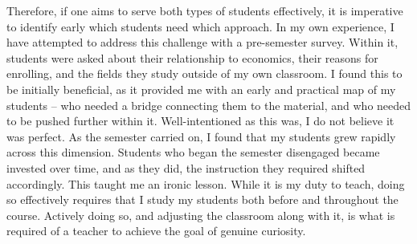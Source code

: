 \documentclass[12pt]{article}
\begin{document}
Therefore, if one aims to serve both types of students effectively, it is imperative to identify early which students need which approach. In my own experience, I have attempted to address this challenge with a pre-semester survey. Within it, students were asked about their relationship to economics, their reasons for enrolling, and the fields they study outside of my own classroom. I found this to be initially beneficial, as it provided me with an early and practical map of my students -- who needed a bridge connecting them to the material, and who needed to be pushed further within it. Well-intentioned as this was, I do not believe it was perfect. As the semester carried on, I found that my students grew rapidly across this dimension. Students who began the semester disengaged became invested over time, and as they did, the instruction they required shifted accordingly. This taught me an ironic lesson. While it is my duty to teach, doing so effectively requires that I study my students both before and throughout the course. Actively doing so, and adjusting the classroom along with it, is what is required of a teacher to achieve the goal of genuine curiosity.  
\end{document}
